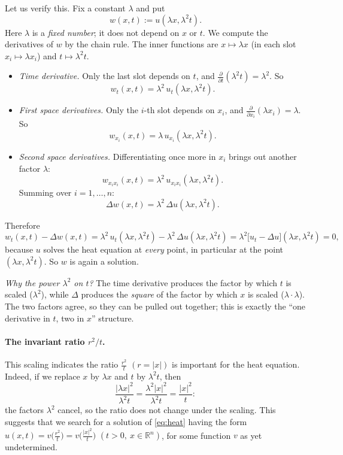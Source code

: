 \documentclass[11pt]{article}
\theoremstyle{plain}
\theoremstyle{definition}
\theoremstyle{remark}
\begin{document}
Let us verify this. Fix a constant $\lambda$ and put
$$ w(x,t) := u(\lambda x, \lambda^2 t). $$
Here $\lambda$ is a \emph{fixed number}; it does not depend on $x$ or $t$. We compute the derivatives of $w$ by the chain rule. The inner functions are $x \mapsto \lambda x$ (in each slot $x_i \mapsto \lambda x_i$) and $t \mapsto \lambda^2 t$.
\begin{itemize}
    \item \emph{Time derivative.} Only the last slot depends on $t$, and $\frac{\partial}{\partial t}(\lambda^2 t) = \lambda^2$. So
    $$ w_t(x,t) = \lambda^2\, u_t(\lambda x, \lambda^2 t). $$
    \item \emph{First space derivatives.} Only the $i$-th slot depends on $x_i$, and $\frac{\partial}{\partial x_i}(\lambda x_i) = \lambda$. So
    $$ w_{x_i}(x,t) = \lambda\, u_{x_i}(\lambda x, \lambda^2 t). $$
    \item \emph{Second space derivatives.} Differentiating once more in $x_i$ brings out another factor $\lambda$:
    $$ w_{x_i x_i}(x,t) = \lambda^2\, u_{x_i x_i}(\lambda x, \lambda^2 t). $$
    Summing over $i = 1,\dots,n$:
    $$ \Delta w(x,t) = \lambda^2\, \Delta u(\lambda x, \lambda^2 t). $$
\end{itemize}
Therefore
$$ w_t(x,t) - \Delta w(x,t) = \lambda^2\, u_t(\lambda x,\lambda^2 t) - \lambda^2\, \Delta u(\lambda x,\lambda^2 t) = \lambda^2\big[u_t - \Delta u\big](\lambda x, \lambda^2 t) = 0, $$
because $u$ solves the heat equation at \emph{every} point, in particular at the point $(\lambda x,\lambda^2 t)$. So $w$ is again a solution.

\emph{Why the power $\lambda^2$ on $t$?} The time derivative produces the factor by which $t$ is scaled ($\lambda^2$), while $\Delta$ produces the \emph{square} of the factor by which $x$ is scaled ($\lambda\cdot\lambda$). The two factors agree, so they can be pulled out together; this is exactly the ``one derivative in $t$, two in $x$'' structure.

\paragraph{The invariant ratio $r^2/t$.} This scaling indicates the ratio $\frac{r^2}{t}$ $(r = |x|)$ is important for the heat equation. Indeed, if we replace $x$ by $\lambda x$ and $t$ by $\lambda^2 t$, then
$$ \frac{|\lambda x|^2}{\lambda^2 t} = \frac{\lambda^2|x|^2}{\lambda^2 t} = \frac{|x|^2}{t}: $$
the factors $\lambda^2$ cancel, so the ratio does not change under the scaling. This suggests that we search for a solution of \eqref{eq:heat} having the form $u(x,t) = v\big(\frac{r^2}{t}\big) = v\big(\frac{|x|^2}{t}\big)$ $(t > 0,\ x \in \mathbb{R}^n)$, for some function $v$ as yet undetermined.
\end{document}
